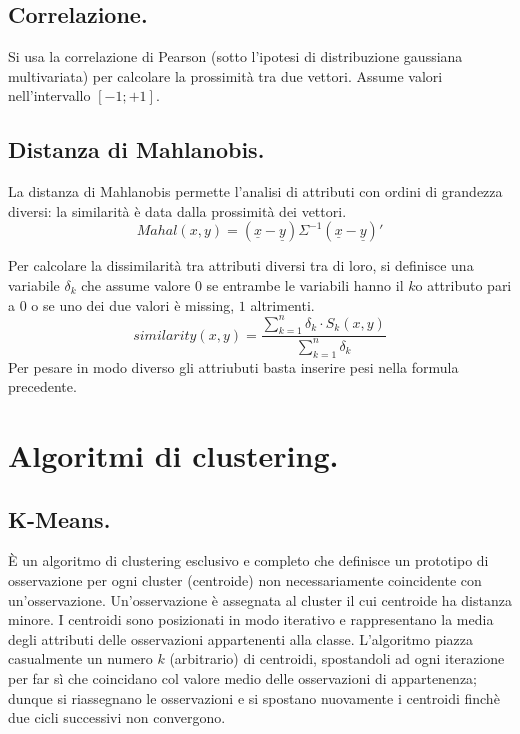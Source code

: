 \documentclass[11pt, a4page, twocolumn]{article}
\begin{document}
\subsection{Correlazione.}
Si usa la correlazione di Pearson (sotto l'ipotesi di distribuzione gaussiana multivariata) per calcolare la prossimità tra due vettori.
Assume valori nell'intervallo $[-1;+1]$.

\subsection{Distanza di Mahlanobis.}
La distanza di Mahlanobis permette l'analisi di attributi con ordini di grandezza diversi: la similarità è data dalla prossimità dei vettori.
\begin{equation*}
Mahal(x, y) = (\underline{x} - \underline{y})\Sigma^{-1}(\underline{x} - \underline{y})'
\end{equation*}

Per calcolare la dissimilarità tra attributi diversi tra di loro, si definisce una variabile $\delta_k$ che assume valore $0$ se entrambe le variabili hanno il $k$o attributo pari a $0$ o se uno dei due valori è missing, $1$ altrimenti.
\begin{equation*}
similarity(x, y) = \frac{\sum^{n}_{k=1}{\delta_k \cdot S_k(x, y)}}{\sum^{n}_{k=1}{\delta_k}}
\end{equation*}
Per pesare in modo diverso gli attriubuti basta inserire pesi nella formula precedente.

\section{Algoritmi di clustering.}
\subsection{K-Means.}
È un algoritmo di clustering esclusivo e completo che definisce un prototipo di osservazione per ogni cluster (centroide) non necessariamente coincidente con un'osservazione.
Un'osservazione è assegnata al cluster il cui centroide ha distanza minore.
I centroidi sono posizionati in modo iterativo e rappresentano la media degli attributi delle osservazioni appartenenti alla classe.
L'algoritmo piazza casualmente un numero $k$ (arbitrario) di centroidi, spostandoli ad ogni iterazione per far sì che coincidano col valore medio delle osservazioni di appartenenza; dunque si riassegnano le osservazioni e si spostano nuovamente i centroidi finchè due cicli successivi non convergono.
\end{document}
